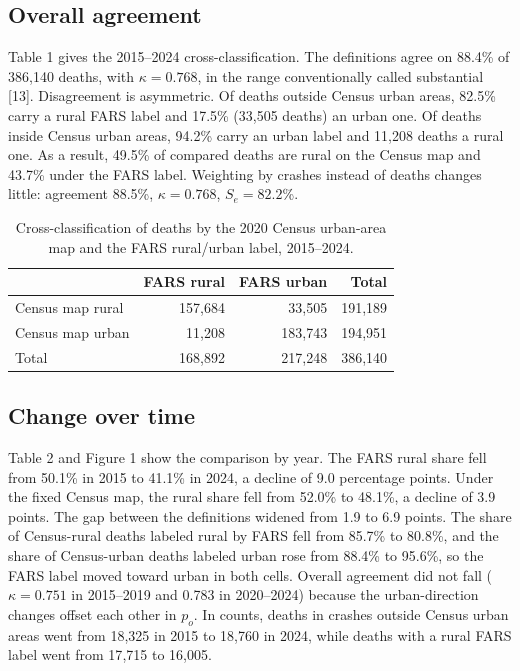 \documentclass[12pt]{article}
\begin{document}
\subsection{Overall agreement}

Table 1 gives the 2015--2024 cross-classification. The definitions agree on 88.4\% of 386{,}140 deaths, with $\kappa = 0.768$, in the range conventionally called substantial [13]. Disagreement is asymmetric. Of deaths outside Census urban areas, 82.5\% carry a rural FARS label and 17.5\% (33{,}505 deaths) an urban one. Of deaths inside Census urban areas, 94.2\% carry an urban label and 11{,}208 deaths a rural one. As a result, 49.5\% of compared deaths are rural on the Census map and 43.7\% under the FARS label. Weighting by crashes instead of deaths changes little: agreement 88.5\%, $\kappa = 0.768$, $S_e = 82.2$\%.

\begin{table}[htbp]\centering\small
\caption{Cross-classification of deaths by the 2020 Census urban-area map and the FARS rural/urban label, 2015--2024.}


\begin{tabular}{lrrr}
 & FARS rural & FARS urban & Total \\
\hline
Census map rural & 157{,}684 & 33{,}505 & 191{,}189 \\
Census map urban & 11{,}208 & 183{,}743 & 194{,}951 \\
Total & 168{,}892 & 217{,}248 & 386{,}140 \\
\end{tabular}

\end{table}

\subsection{Change over time}

Table 2 and Figure 1 show the comparison by year. The FARS rural share fell from 50.1\% in 2015 to 41.1\% in 2024, a decline of 9.0 percentage points. Under the fixed Census map, the rural share fell from 52.0\% to 48.1\%, a decline of 3.9 points. The gap between the definitions widened from 1.9 to 6.9 points. The share of Census-rural deaths labeled rural by FARS fell from 85.7\% to 80.8\%, and the share of Census-urban deaths labeled urban rose from 88.4\% to 95.6\%, so the FARS label moved toward urban in both cells. Overall agreement did not fall ($\kappa = 0.751$ in 2015--2019 and 0.783 in 2020--2024) because the urban-direction changes offset each other in $p_o$. In counts, deaths in crashes outside Census urban areas went from 18{,}325 in 2015 to 18{,}760 in 2024, while deaths with a rural FARS label went from 17{,}715 to 16{,}005.
\end{document}
